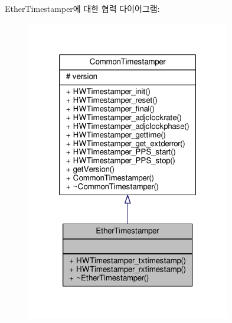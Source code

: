 Ether\+Timestamper에 대한 협력 다이어그램\+:
\nopagebreak
\begin{figure}[H]
\begin{center}
\leavevmode
\includegraphics[width=253pt]{class_ether_timestamper__coll__graph}
\end{center}
\end{figure}
